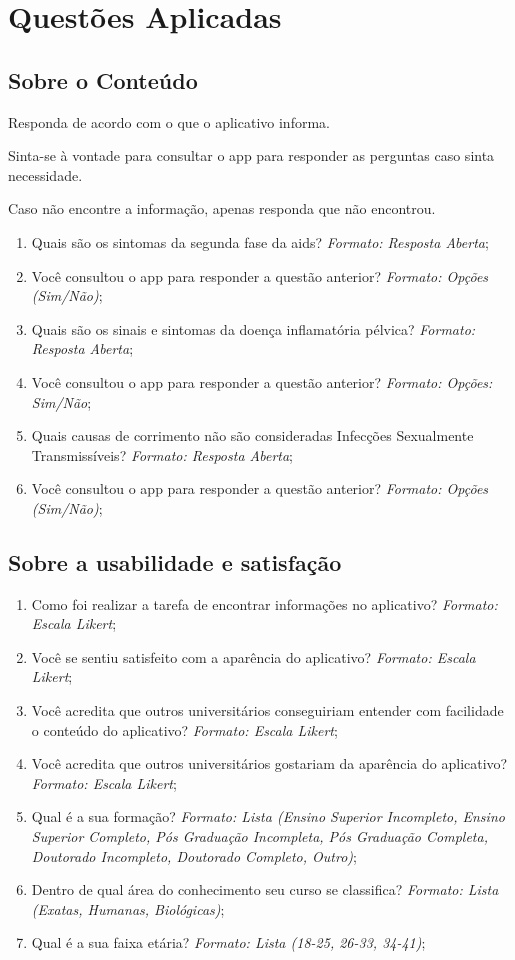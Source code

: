 \documentclass[12pt]{article}
\begin{document}
\section{Questões Aplicadas}
\label{ap:questoes}

\subsection{Sobre o Conteúdo}

Responda de acordo com o que o aplicativo informa. 

Sinta-se à vontade para consultar o app para responder as perguntas caso sinta necessidade. 

Caso não encontre a informação, apenas responda que não encontrou.

\begin{enumerate}
	\item Quais são os sintomas da segunda fase da aids? \textit{Formato: Resposta Aberta};
	\item Você consultou o app para responder a questão anterior? \textit{Formato: Opções (Sim/Não)};
	\item Quais são os sinais e sintomas da doença inflamatória pélvica? \textit{Formato: Resposta Aberta};
	\item Você consultou o app para responder a questão anterior? \textit{Formato: Opções: Sim/Não};
	\item Quais causas de corrimento não são consideradas Infecções Sexualmente Transmissíveis? \textit{Formato: Resposta Aberta};
	\item Você consultou o app para responder a questão anterior? \textit{Formato: Opções (Sim/Não)};
\end{enumerate}

\subsection{Sobre a usabilidade e satisfação}

\begin{enumerate}
	\item Como foi realizar a tarefa de encontrar informações no aplicativo? \textit{Formato: Escala Likert};
	\item Você se sentiu satisfeito com a aparência do aplicativo? \textit{Formato: Escala Likert};
	\item Você acredita que outros universitários conseguiriam entender com facilidade o conteúdo do aplicativo? \textit{Formato: Escala Likert};
	\item Você acredita que outros universitários gostariam da aparência do aplicativo? \textit{Formato: Escala Likert};
	\item Qual é a sua formação? \textit{Formato: Lista (Ensino Superior Incompleto, Ensino Superior Completo, Pós Graduação Incompleta, Pós Graduação Completa, Doutorado Incompleto, Doutorado Completo, Outro)};
	\item Dentro de qual área do conhecimento seu curso se classifica? \textit{Formato: Lista (Exatas, Humanas, Biológicas)};
	\item Qual é a sua faixa etária? \textit{Formato: Lista (18-25, 26-33, 34-41)};
\end{enumerate}
\end{document}
